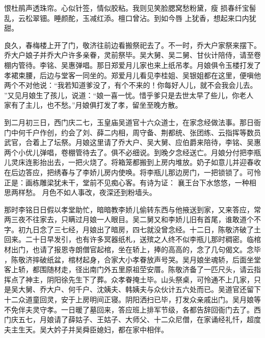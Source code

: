 恨杜鹃声透珠帘。心似针签，情似胶粘。我则见笑脸腮窝愁粉黛，瘦
损春纤宝髻乱，云松翠钿。睡颜酡，玉减红添。檀口曾沾。到如今唇
上犹香，想起来口内犹甜。

良久，春梅楼上开了门，敬济往前边看搬祭祀去了。不一时，乔大户家祭来摆下。
乔大户娘子并乔大户许多亲眷，灵前祭毕。吴大舅、吴二舅、甘伙计陪侍，请至卷
棚内管待。李铭、吴惠弹唱。那日郑爱月儿家也来上纸吊孝。月娘俱令玉楼打发了
孝裙束腰，后边与堂客一同坐的。郑爱月儿看见李桂姐、吴银姐都在这里，便嗔他
两个不对他说：“我若知道爹没了，有个不来的！你每好人儿，就不会我会儿去。
”又见月娘生了孩儿，说道：“娘一喜一忧。惜乎爹只是去世太早了些儿，你老人
家有了主儿，也不愁。”月娘俱打发了孝，留坐至晚方散。

到二月初三日，西门庆二七，玉皇庙吴道官十六众道士，在家念经做法事。那日衙
门中何千户作创，约会了刘、薛二内相，周守备、荆都统、张团练、云指挥等数员
武官，合着上了坛祭。月娘这里请了乔大户、吴大舅、应伯爵来陪待，李铭、吴惠
两个小优儿弹唱，卷棚管待去了。俱不必细说。到晚夕念经送亡。月娘分付把李瓶
儿灵床连影抬出去，一把火烧了。将箱笼都搬到上房内堆放。奶子如意儿并迎春收
在后边答应，把绣春与了李娇儿房内使唤。将李瓶儿那边房门，一把锁锁了。可怜
正是：画栋雕梁犹未干，堂前不见痴心客。有诗为证：
襄王台下水悠悠，一种相思两样愁。
月色不如人事改，夜深还到粉墙头。

那时李铭日日假以孝堂助忙，暗暗教李娇儿偷转东西与他掖送到家，又来答应，常
两三夜不往家去，只瞒过月娘一人眼目。吴二舅又和李娇儿旧有首尾，谁敢道个不
字。初九日念了三七经，月娘出了暗房，四七就没曾念经。十二日，陈敬济破了土
回来。二十日早发引，也有许多冥器纸札，送殡之人终不似李瓶儿那时稠密。临棺
材出门，也请了报恩寺朗僧官起棺，坐在轿上，捧的高高的，念了几句偈文。念毕
，陈敬济摔破纸盆，棺材起身，合家大小孝眷放声号哭。吴月娘坐魂轿，后面坐堂
客上轿，都围随材走，径出南门外五里原祖茔安厝。陈敬济备了一匹尺头，请云指
挥点了神主，阴阳徐先生下了葬。众孝眷掩土毕。山头祭桌，可怜通不上几家，只
是吴大舅、乔大户、何千户、沈姨夫、韩姨夫与众伙计五六处而已。吴道官还留下
十二众道童回灵，安于上房明间正寝。阴阳洒扫已毕，打发众亲戚出门。吴月娘等
不免伴夫灵守孝。一日暖了墓回来，答应班上排军节级，各都告辞回衙门去了。西
门庆五七，月娘请了薛姑子、王姑子、大师父、十二众尼僧，在家诵经礼忏，超度
夫主生天。吴大妗子并吴舜臣媳妇，都在家中相伴。

